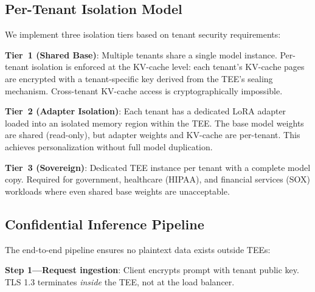 \documentclass[conference,10pt]{IEEEtran}
\begin{document}
\subsection{Per-Tenant Isolation Model}

We implement three isolation tiers based on tenant security requirements:

\begin{table}[!htbp]
\caption{Tenant Isolation Tiers}
\label{tab:tiers}
\centering\scriptsize
{}
\end{table}

\textbf{Tier~1 (Shared Base)}: Multiple tenants share a single model instance. Per-tenant isolation is enforced at the KV-cache level: each tenant's KV-cache pages are encrypted with a tenant-specific key derived from the TEE's sealing mechanism. Cross-tenant KV-cache access is cryptographically impossible.

\textbf{Tier~2 (Adapter Isolation)}: Each tenant has a dedicated LoRA adapter~\cite{hu2024lora} loaded into an isolated memory region within the TEE. The base model weights are shared (read-only), but adapter weights and KV-cache are per-tenant. This achieves personalization without full model duplication.

\textbf{Tier~3 (Sovereign)}: Dedicated TEE instance per tenant with a complete model copy. Required for government, healthcare (HIPAA), and financial services (SOX) workloads where even shared base weights are unacceptable.

\subsection{Confidential Inference Pipeline}

The end-to-end pipeline ensures no plaintext data exists outside TEEs:

\textbf{Step 1---Request ingestion}: Client encrypts prompt with tenant public key. TLS 1.3 terminates \emph{inside} the TEE, not at the load balancer.
\end{document}
